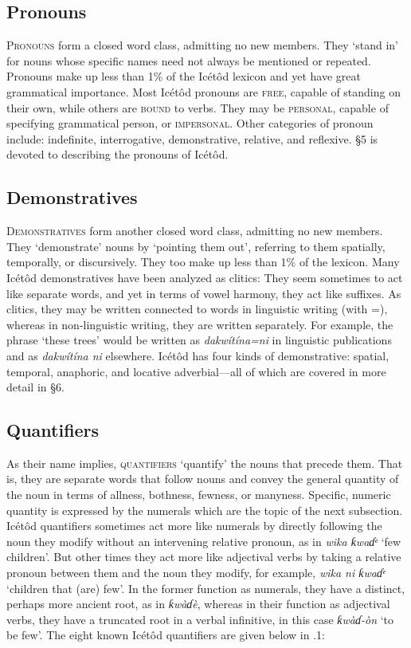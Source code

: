 \subsection{Pronouns}


\textsc{Pronouns} form a closed word class, admitting no new members. They ‘stand in’ for nouns whose specific names need not always be mentioned or repeated. Pronouns make up less than 1\% of the Icétôd lexicon and yet have great grammatical importance. Most Icétôd pronouns are \textsc{free}, capable of standing on their own, while others are \textsc{bound} to verbs. They may be \textsc{personal}, capable of specifying grammatical person, or \textsc{impersonal}. Other categories of pronoun include: indefinite, interrogative, demonstrative, relative, and reflexive. §5 is devoted to describing the pronouns of Icétôd.
 
\subsection{Demonstratives}


\textsc{Demonstratives} form another closed word class, admitting no new members. They ‘demonstrate’ nouns by ‘pointing them out’, referring to them spatially, temporally, or discursively. They too make up less than 1\% of the lexicon. Many Icétôd demonstratives have been analyzed as clitics: They seem sometimes to act like separate words, and yet in terms of vowel harmony, they act like suffixes. As clitics, they may be written connected to words in linguistic writing (with =), whereas in non-linguistic writing, they are written separately. For example, the phrase ‘these trees’ would be written as \textit{dakwítína=ni }in linguistic publications and as \textit{dakwítína ni} elsewhere. Icétôd has four kinds of demonstrative: spatial, temporal, anaphoric, and locative adverbial—all of which are covered in more detail in §6.
 
\subsection{Quantifiers}


As their name implies, \textsc{quantifiers} ‘quantify’ the nouns that precede them. That is, they are separate words that follow nouns and convey the general quantity of the noun in terms of allness, bothness, fewness, or manyness. Specific, numeric quantity is expressed by the numerals which are the topic of the next subsection. Icétôd quantifiers sometimes act more like numerals by directly following the noun they modify without an intervening relative pronoun, as in \textit{wika ƙwaɗᵉ }‘few children’. But other times they act more like adjectival verbs by taking a relative pronoun between them and the noun they modify, for example, \textit{wika ni ƙwaɗᵉ }‘children that (are) few’. In the former function as numerals, they have a distinct, perhaps more ancient root, as in \textit{ƙwàɗè}, whereas in their function as adjectival verbs, they have a truncated root in a verbal infinitive, in this case \textit{ƙwàɗ-òn }‘to be few’. The eight known Icétôd quantifiers are given below in .1:


